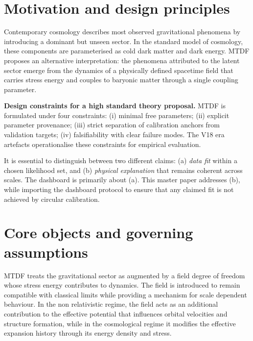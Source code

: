 \documentclass[11pt,a4paper]{article}
\begin{document}
\section{Motivation and design principles}
\label{sec:sec1}
Contemporary cosmology describes most observed gravitational phenomena by introducing a dominant but unseen sector. In the standard model of cosmology, these components are parameterised as cold dark matter and dark energy. MTDF proposes an alternative interpretation: the phenomena attributed to the latent sector emerge from the dynamics of a physically defined spacetime field that carries stress energy and couples to baryonic matter through a single coupling parameter.

\begin{mdframed}[linecolor=accent,linewidth=0.5pt,backgroundcolor=callout-bg,leftline=true,rightline=true,topline=true,bottomline=true,innerleftmargin=8pt,innerrightmargin=8pt,innertopmargin=6pt,innerbottommargin=6pt]
\textbf{Design constraints for a high standard theory proposal.} MTDF is formulated under four constraints: (i) minimal free parameters; (ii) explicit parameter provenance; (iii) strict separation of calibration anchors from validation targets; (iv) falsifiability with clear failure modes. The V18 era artefacts operationalise these constraints for empirical evaluation.
\end{mdframed}

It is essential to distinguish between two different claims: (a) \emph{data fit} within a chosen likelihood set, and (b) \emph{physical explanation} that remains coherent across scales. The dashboard is primarily about (a). This master paper addresses (b), while importing the dashboard protocol to ensure that any claimed fit is not achieved by circular calibration.

\section{Core objects and governing assumptions}
\label{sec:sec2}
MTDF treats the gravitational sector as augmented by a field degree of freedom whose stress energy contributes to dynamics. The field is introduced to remain compatible with classical limits while providing a mechanism for scale dependent behaviour. In the non relativistic regime, the field acts as an additional contribution to the effective potential that influences orbital velocities and structure formation, while in the cosmological regime it modifies the effective expansion history through its energy density and stress.
\end{document}
